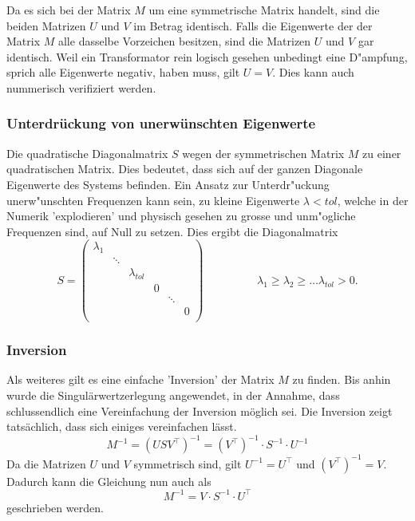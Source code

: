 \begin{refsection}
Da es sich bei der Matrix $M$ um eine symmetrische Matrix handelt, sind die beiden Matrizen $U$ und $V$ im Betrag identisch. Falls die Eigenwerte der der Matrix $M$ alle dasselbe Vorzeichen besitzen, sind die Matrizen $U$ und $V$ gar identisch. Weil ein Transformator rein logisch gesehen unbedingt eine D"ampfung, sprich alle Eigenwerte negativ, haben muss, gilt $U = V$. Dies kann auch nummerisch verifiziert werden.

\subsubsection{Unterdrückung von unerwünschten Eigenwerte}
Die quadratische Diagonalmatrix $S$ wegen der symmetrischen Matrix $M$ zu einer quadratischen Matrix. Dies bedeutet, dass sich auf der ganzen Diagonale Eigenwerte des Systems befinden. Ein Ansatz zur Unterdr"uckung unerw"unschten Frequenzen kann sein, zu kleine Eigenwerte $\lambda < tol$, welche in der Numerik 'explodieren' und physisch gesehen zu grosse und unm"ogliche Frequenzen sind, auf Null zu setzen. Dies ergibt die Diagonalmatrix 
\begin{equation*}
	S = \left( 
			\begin{array}{cccccc}
				\lambda_1 & & & & & \\
				& \ddots & & & &  \\
				& & \lambda_{tol} & & & \\
				& & & 0 & & \\
				& & & & \ddots & \\
				& & & & & 0 \\				
				\end{array}
			\right) 
			\hspace{2cm}\lambda_1 \geq \lambda_2 \geq \dots \lambda_{tol} > 0. 
\end{equation*}

\subsubsection{Inversion}
Als weiteres gilt es eine einfache 'Inversion' der Matrix $M$ zu finden. Bis anhin wurde die Singulärwertzerlegung angewendet, in der Annahme, dass schlussendlich eine Vereinfachung der Inversion möglich sei. Die Inversion zeigt tatsächlich, dass sich einiges vereinfachen lässt.
\begin{equation*}
	M^{-1} = \left(USV^\top\right)^{-1} = \left(V^\top\right)^{-1} \cdot S^{-1} \cdot U^{-1}
\end{equation*}
Da die Matrizen $U$ und $V$ symmetrisch sind, gilt $U^{-1} = U^\top$ und $\left(V^\top\right)^{-1} = V$. Dadurch kann die Gleichung nun auch als 
\begin{equation*}
	M^{-1} = V \cdot S^{-1} \cdot U^\top
\end{equation*}
geschrieben werden.


\end{refsection}

